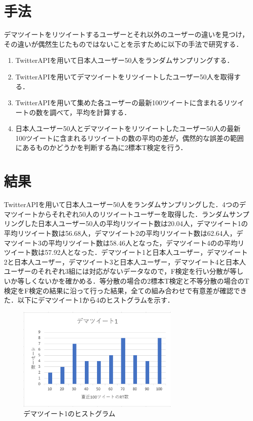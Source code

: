 \documentclass[uplatex,twocolumn]{jsarticle}
\begin{document}
\section{手法}
デマツイートをリツイートするユーザーとそれ以外のユーザーの違いを見つけ，その違いが偶然生じたものではないことを示すために以下の手法で研究する．
\begin{enumerate}
\item TwitterAPIを用いて日本人ユーザー50人をランダムサンプリングする．
\item TwitterAPIを用いてデマツイートをリツイートしたユーザー50人を取得する．
\item TwitterAPIを用いて集めた各ユーザーの最新100ツイートに含まれるリツイートの数を調べて，平均を計算する．
\item 日本人ユーザー50人とデマツイートをリツイートしたユーザー50人の最新100ツイートに含まれるリツイートの数の平均の差が，偶然的な誤差の範囲にあるものかどうかを判断する為に2標本T検定\cite{T}を行う．
\end{enumerate}

\section{結果}
TwitterAPIを用いて日本人ユーザー50人をランダムサンプリングした．4つのデマツイートからそれぞれ50人のリツイートユーザーを取得した．ランダムサンプリングした日本人ユーザー50人の平均リツイート数は20.04人，デマツイート1の平均リツイート数は56.68人，デマツイート2の平均リツイート数は62.64人，デマツイート3の平均リツイート数は58.46人となった，デマツイート4のの平均リツイート数は57.92人となった．デマツイート1と日本人ユーザー，デマツイート2と日本人ユーザー，デマツイート3と日本人ユーザー，デマツイート4と日本人ユーザーのそれぞれ3組には対応がないデータなので，F検定を行い分散が等しいか等しくないかを確かめる．等分散の場合の2標本T検定と不等分散の場合のT検定をF検定の結果に沿って行った結果，全ての組み合わせで有意差が確認できた．以下にデマツイート1から4のヒストグラムを示す．

\begin{figure}[htbp]
\centering
\includegraphics[clip,width=8.0cm]{d1.png}
\caption{デマツイート1のヒストグラム}
\label{ヒストグラム1}
\end{figure}
\end{document}
